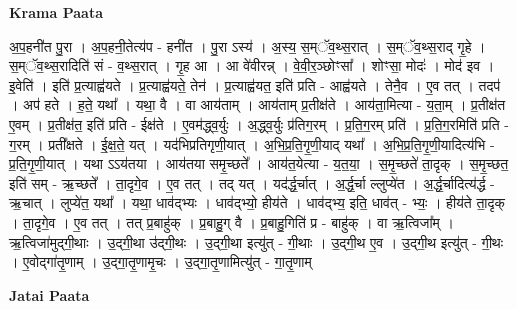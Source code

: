 \documentclass[17pt]{extarticle}
\begin{document}
\textbf{Krama Paata} \newline

अ॒प॒हनी॑त पु॒रा । अ॒प॒हनी॒तेत्य॑प - हनी॑त । पु॒रा ऽस्य॑ । अ॒स्य॒ स॒म्ॅव॒थ्स॒रात् । स॒म्ॅव॒थ्स॒राद् गृ॒हे । स॒म्ॅव॒थ्स॒रादिति॑ सं - व॒थ्स॒रात् । गृ॒ह आ । आ वे॑वीरन्न् । वे॒वी॒र॒ञ्छोꣳसा᳚ । शोꣳसा॒ मोदः॑ । मोद॑ इव । इ॒वेति॑ । इति॑ प्र॒त्याह्व॑यते । प्र॒त्याह्व॑यते॒ तेन॑ । प्र॒त्याह्व॑यत॒ इति॑ प्रति - आह्व॑यते । तेनै॒व । ए॒व तत् । तदप॑ । अप॑ हते । ह॒ते॒ यथा᳚ । यथा॒ वै । वा आय॑ताम् । आय॑ताम् प्र॒तीक्ष॑ते । आय॑ता॒मित्या - य॒ता॒म् । प्र॒तीक्ष॑त ए॒वम् । प्र॒तीक्ष॑त॒ इति॑ प्रति - ईक्ष॑ते । ए॒वम॑द्ध्व॒र्युः । अ॒द्ध्व॒र्युः प्र॑तिग॒रम् । प्र॒ति॒ग॒रम् प्रति॑ । प्र॒ति॒ग॒रमिति॑ प्रति - ग॒रम् । प्रती᳚क्षते । ई॒क्ष॒ते॒ यत् । यद॑भिप्रतिगृणी॒यात् । अ॒भि॒प्र॒ति॒गृ॒णी॒याद् यथा᳚ । अ॒भि॒प्र॒ति॒गृ॒णी॒यादित्य॑भि - प्र॒ति॒गृ॒णी॒यात् । यथा ऽऽय॑तया । आय॑तया समृ॒च्छते᳚ । आय॑त॒येत्या - य॒त॒या॒ । स॒मृ॒च्छते॑ ता॒दृक् । स॒मृ॒च्छत॒ इति॑ सम् - ऋ॒च्छते᳚ । ता॒दृगे॒व । ए॒व तत् । तद् यत् । यद॑र्द्ध॒र्चात् । अ॒र्द्ध॒र्चा ल्लुप्ये॑त । अ॒र्द्ध॒र्चादित्य॑र्द्ध - ऋ॒चात् । लुप्ये॑त॒ यथा᳚ । यथा॒ धाव॑द्भ्यः । धाव॑द्भ्यो॒ हीय॑ते । धाव॑द्भ्य॒ इति॒ धाव॑त् - भ्यः॒ । हीय॑ते ता॒दृक् । ता॒दृगे॒व । ए॒व तत् । तत् प्र॒बाहु॑क् । प्र॒बाहु॒ग् वै । प्र॒बाहु॒गिति॑ प्र - बाहु॑क् । वा ऋ॒त्विजा᳚म् । ऋ॒त्विजा॑मुद्गी॒थाः । उ॒द्गी॒था उ॑द्गी॒थः । उ॒द्गी॒था इत्यु॑त् - गी॒थाः । उ॒द्गी॒थ ए॒व । उ॒द्गी॒थ इत्यु॑त् - गी॒थः । ए॒वोद्गा॑तृ॒णाम् । उ॒द्गा॒तृ॒णामृ॒चः । उ॒द्गा॒तृ॒णामित्यु॑त् - गा॒तृ॒णाम् \newline

\textbf{Jatai Paata} \newline
\end{document}
